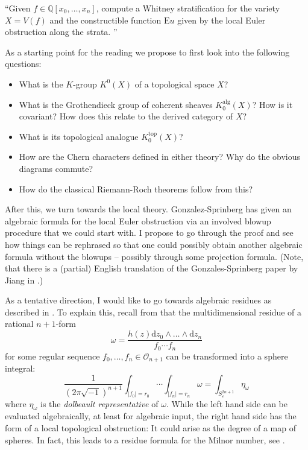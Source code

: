 \documentclass[a4paper]{article}
\newcommand{\D}{\mathrm{d}}
\begin{document}
\begin{centering}
  ``Given $f \in \mathbb{Q}[x_0,\dots,x_n]$, compute a Whitney stratification for 
  the variety $X = V(f)$ and the constructible function $\mathrm Eu$ given by 
  the local Euler obstruction along the strata. ''
\end{centering}

As a starting point for the reading we propose \cite{BaumFultonMacPherson79} 
to first look into the following questions:
\begin{itemize}
  \item What is the $K$-group $K^0(X)$ of a topological space $X$? 
  \item What is the Grothendieck group of coherent sheaves $K^{\mathrm{alg}}_0(X)$? 
    How is it covariant? How does this relate to the derived category of $X$?
  \item What is its topological analogue $K^{\mathrm{top}}_0(X)$? 
  \item How are the Chern characters defined in either theory? Why do the 
    obvious diagrams commute? 
  \item How do the classical Riemann-Roch theorems follow from this? 
\end{itemize}

After this, we turn towards the local theory. Gonzalez-Sprinberg has 
given an algebraic formula for the local Euler obstruction via an involved 
blowup procedure \cite{Gonzalez81} that we could start with. 
I propose to go through the proof and see how things can be rephrased so that 
one could possibly obtain another algebraic formula without the blowups -- 
possibly through some projection formula. 
(Note, that there is a (partial) English translation of the Gonzales-Sprinberg 
paper by Jiang in \cite{Jiang19}.)

As a tentative direction, I would like to go towards algebraic residues
as described in \cite[Chapter 5]{GriffithsHarris78}. 
To explain this, recall from \cite{GriffithsHarris78} that the multidimensional 
residue of a rational $n+1$-form 
\[
  \omega = \frac{h(z)\D z_0 \wedge \dots \wedge \D z_n}{f_0 \cdots f_n}
\]
for some regular sequence $f_0,\dots,f_n \in \mathcal{O}_{n+1}$ 
can be transformed into a sphere integral:
\[
  \frac{1}{(2\pi \sqrt{-1})^{n+1}}
  \int_{|f_0| = r_0} \cdots \int_{|f_n| = r_n} \omega
  =
  \int_{S_\varepsilon^{2n+1}} \eta_\omega
\]
where $\eta_\omega$ is the \textit{dolbeault representative} of $\omega$.
While the left hand side can be evaluated algebraically, at least 
for algebraic input, the right hand side has the form of a local 
topological obstruction: It could arise as the degree of a map of 
spheres. In fact, this leads to a residue formula for the Milnor 
number, see \cite{BrasseletLehmannSeadeSuwa99}. 
\end{document}
